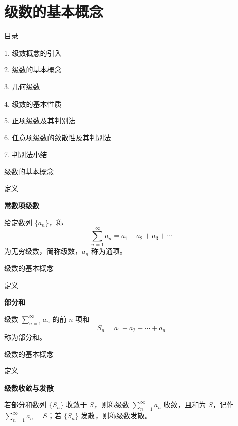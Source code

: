 \documentclass[aspectratio=169,10pt,fontset=fandol]{ctexbeamer}
\begin{document}
\section{级数的基本概念}
\begin{frame}[t,fragile]{目录}
\normalsize
{\color{black}\normalsize 1. 级数概念的引入\par}\vspace{0.3em}
{\color{blue}\normalsize 2. 级数的基本概念\par}\vspace{0.3em}
{\color{gray!40}\normalsize 3. 几何级数\par}\vspace{0.3em}
{\color{gray!40}\normalsize 4. 级数的基本性质\par}\vspace{0.3em}
{\color{gray!40}\normalsize 5. 正项级数及其判别法\par}\vspace{0.3em}
{\color{gray!40}\normalsize 6. 任意项级数的敛散性及其判别法\par}\vspace{0.3em}
{\color{gray!40}\normalsize 7. 判别法小结\par}\vspace{0.3em}
\end{frame}
\begin{frame}[t,fragile]{级数的基本概念}
\footnotesize
\begin{block}{定义}
{\footnotesize
\textbf{常数项级数}\par

给定数列 \(\{a_n\}\)，称
\[
\sum_{n=1}^{\infty} a_n = a_1 + a_2 + a_3 + \cdots
\]
为无穷级数，简称级数，\(a_n\) 称为通项。

}
\end{block}
\end{frame}
\begin{frame}[t,fragile]{级数的基本概念}
\footnotesize
\begin{block}{定义}
{\footnotesize
\textbf{部分和}\par

级数 \(\sum\limits_{n = 1}^{  \infty }  a_n\) 的前 \(n\) 项和
\[
S_n = a_1 + a_2 + \cdots + a_n
\]
称为部分和。

}
\end{block}
\end{frame}
\begin{frame}[t,fragile]{级数的基本概念}
\footnotesize
\begin{block}{定义}
{\footnotesize
\textbf{级数收敛与发散}\par

若部分和数列 \(\{S_n\}\) 收敛于 \(S\)，则称级数 \(\sum\limits_{n = 1}^{  \infty } a_n\) 收敛，且和为 \(S\)，记作 \(\sum\limits_{n = 1}^{  \infty } a_n = S\)；若 \(\{S_n\}\) 发散，则称级数发散。

}
\end{block}
\end{frame}
\end{document}
